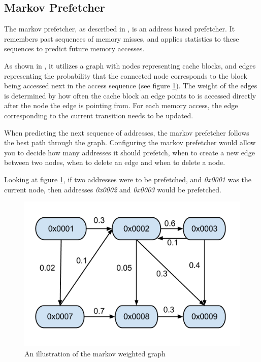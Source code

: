 \subsection{Markov Prefetcher}
\label{sec:markovPrefetcher}
The markov prefetcher, as described in \cite{Grannas}, is an address based prefetcher. It remembers past sequences of memory misses, and applies statistics to these sequences to predict future memory accesses.

As shown in \cite{Joseph}, it utilizes a graph with nodes representing cache blocks, and edges representing the probability that the connected node corresponds to the block being accessed next in the access sequence (see figure \ref{fig:markov}). The weight of the edges is determined by how often the cache block an edge points to is accessed directly after the node the edge is pointing from. For each memory access, the edge corresponding to the current transition needs to be updated. 

When predicting the next sequence of addresses, the markov prefetcher follows the best path through the graph. Configuring the markov prefetcher would allow you to decide how many addresses it should prefetch, when to create a new edge between two nodes, when to delete an edge and when to delete a node.

Looking at figure \ref{fig:markov}, if two addresses were to be prefetched, and \emph{0x0001} was the current node, then addresses \emph{0x0002} and \emph{0x0003} would be prefetched.

\begin{figure}[H]
\includegraphics[scale=0.5]{./figures/markov}
\caption{\label{fig:markov}An illustration of the markov weighted graph}
\end{figure}

